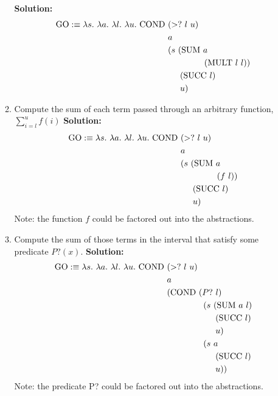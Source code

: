 \documentclass[11pt]{report}
\begin{document}
\begin{enumerate}
\begin{enumerate}
	 	\textbf{Solution:}	 		
	 		\begin{align*}
	 			\GO :\equiv \lambda s. \ \lambda a. \ \lambda l. \ \lambda u. \ \COND \ &(>? \ l \ u) \\
	 			&a \\
	 			&(s \ (\SUM \ a \\
	 			&\hspace{15mm}(\MULT \ l \ l)) \\
	 			&\hspace{5mm}(\SUCC \ l) \\
	 			&\hspace{5mm}u)	
	 		\end{align*}	 	
	 	\item Compute the sum of each term passed through an arbitrary function, $\sum_{i=l}^u f(i)$	 	
	 	\textbf{Solution:}	 		
	 		\begin{align*}
	 			\GO :\equiv \lambda s. \ \lambda a. \ \lambda l. \ \lambda u. \ \COND \ &(>? \ l \ u) \\
	 			&a \\
	 			&(s \ (\SUM \ a \\
	 			&\hspace{15mm}(f \ l)) \\
	 			&\hspace{5mm}(\SUCC \ l) \\
	 			&\hspace{5mm}u)	
	 		\end{align*}
	 		Note: the function $f$ could be factored out into the abstractions.
	 	\item Compute the sum of those terms in the interval that satisfy some predicate $P?(x)$.	 	
	 	\textbf{Solution:}	 		
	 		\begin{align*}
	 			\GO :\equiv \lambda s. \ \lambda a. \ \lambda l. \ \lambda u. \ \COND \ &(>? \ l \ u) \\
	 			&a \\
	 			&(\COND \ (P? \ l) \\
	 			&\hspace{15mm}(s \ (\SUM \ a \ l)\\
	 			&\hspace{20mm}(\SUCC \ l) \\
	 			&\hspace{20mm}u)\\
	 			&\hspace{15mm}(s \ a \\ 
	 			&\hspace{20mm}(\SUCC \ l) \\
	 			&\hspace{20mm}u))
	 		\end{align*}
	 		Note: the predicate P? could be factored out into the abstractions.
	 \end{enumerate}
	 

\end{enumerate}
\end{document}
